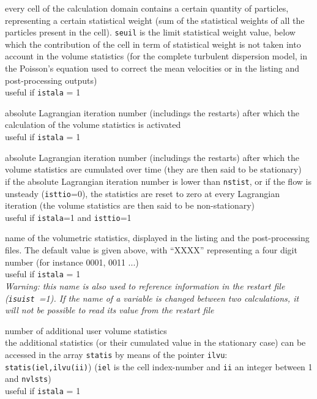 {every cell of the calculation domain contains a certain quantity of
particles, representing a certain statistical weight (sum of the
statistical weights of all the particles present in the cell). \texttt{seuil}
is the limit statistical weight value, below which the contribution of the
cell in term of statistical weight is not taken into account in the volume
statistics (for the complete turbulent dispersion model, in the
Poisson's equation used to correct the mean velocities or in the listing and
post-processing outputs)\\
useful if \texttt{istala} = 1}

{absolute Lagrangian iteration number (includings the restarts) after
which the calculation of the volume statistics is activated\\
useful if \texttt{istala} = 1}

{absolute Lagrangian iteration number (includings the restarts) after
which the volume statistics are cumulated over time (they are then said to be
stationary)\\
if the absolute Lagrangian iteration number is lower than \texttt{nstist},
or if the flow is unsteady (\texttt{isttio}=0), the statistics are reset
to zero at every Lagrangian iteration (the volume statistics are then said
to be non-stationary)\\
useful if \texttt{istala}=1 and \texttt{isttio}=1}

{name of the volumetric statistics, displayed in the listing
and the post-processing files. The default value is given above, with ``XXXX''
representing a four digit number (for instance 0001, 0011 ...)\\
useful if \texttt{istala} = 1\\
{\em Warning: this name is also used to reference information in the restart file
\mbox{(\texttt{isuist} =1)}. If the name of a variable is changed between two
calculations, it will not be possible to read its value from the restart file}}

{number of additional user volume statistics\\
the additional statistics (or their cumulated value in the stationary
case) can be accessed in the array \texttt{statis} by means of the pointer
\texttt{ilvu}: \texttt{statis(iel,ilvu(ii)})
(\texttt{iel} is the cell index-number and \texttt{ii} an integer between
1 and \texttt{nvlsts})\\
useful if \texttt{istala} = 1}

